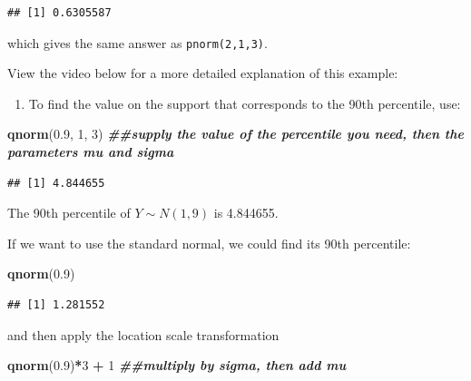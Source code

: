 \documentclass[
]{book}
\newenvironment{Shaded}{\begin{snugshade}}{\end{snugshade}}
\newcommand{\DecValTok}[1]{\textcolor[rgb]{0.00,0.00,0.81}{#1}}
\newcommand{\DocumentationTok}[1]{\textcolor[rgb]{0.56,0.35,0.01}{\textbf{\textit{#1}}}}
\newcommand{\FloatTok}[1]{\textcolor[rgb]{0.00,0.00,0.81}{#1}}
\newcommand{\FunctionTok}[1]{\textcolor[rgb]{0.13,0.29,0.53}{\textbf{#1}}}
\newcommand{\NormalTok}[1]{#1}
\newcommand{\SpecialCharTok}[1]{\textcolor[rgb]{0.81,0.36,0.00}{\textbf{#1}}}
\providecommand{\tightlist}{%
  \setlength{\itemsep}{0pt}\setlength{\parskip}{0pt}}
\begin{document}
\begin{verbatim}
## [1] 0.6305587
\end{verbatim}

which gives the same answer as \texttt{pnorm(2,1,3)}.

View the video below for a more detailed explanation of this example:

\begin{enumerate}
\def\labelenumi{\arabic{enumi}.}
\setcounter{enumi}{2}
\tightlist
\item
  To find the value on the support that corresponds to the 90th percentile, use:
\end{enumerate}

\begin{Shaded}
\begin{Highlighting}[]
\FunctionTok{qnorm}\NormalTok{(}\FloatTok{0.9}\NormalTok{, }\DecValTok{1}\NormalTok{, }\DecValTok{3}\NormalTok{) }\DocumentationTok{\#\#supply the value of the percentile you need, then the parameters mu and sigma}
\end{Highlighting}
\end{Shaded}

\begin{verbatim}
## [1] 4.844655
\end{verbatim}

The 90th percentile of \(Y \sim N(1,9)\) is 4.844655.

If we want to use the standard normal, we could find its 90th percentile:

\begin{Shaded}
\begin{Highlighting}[]
\FunctionTok{qnorm}\NormalTok{(}\FloatTok{0.9}\NormalTok{)}
\end{Highlighting}
\end{Shaded}

\begin{verbatim}
## [1] 1.281552
\end{verbatim}

and then apply the location scale transformation

\begin{Shaded}
\begin{Highlighting}[]
\FunctionTok{qnorm}\NormalTok{(}\FloatTok{0.9}\NormalTok{)}\SpecialCharTok{*}\DecValTok{3} \SpecialCharTok{+} \DecValTok{1} \DocumentationTok{\#\#multiply by sigma, then add mu}
\end{Highlighting}
\end{Shaded}
\end{document}
